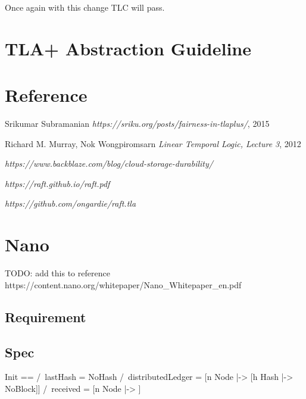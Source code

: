 \documentclass{report}
\begin{document}
Once again with this change TLC will pass.

\chapter{TLA+ Abstraction Guideline}

\chapter{Reference}

\begin{thebibliography}{9}

\bibitem{}
Srikumar Subramanian
\textit{https://sriku.org/posts/fairness-in-tlaplus/}, 2015

\bibitem{}
Richard M. Murray, Nok Wongpiromsarn
\textit{Linear Temporal Logic, Lecture 3}, 2012

\textit{https://www.backblaze.com/blog/cloud-storage-durability/}

\textit{https://raft.github.io/raft.pdf}

\textit{https://github.com/ongardie/raft.tla}

\end{thebibliography}

\chapter{Nano}

TODO: add this to reference\newline
https://content.nano.org/whitepaper/Nano\_Whitepaper\_en.pdf

\section{Requirement}

\section{Spec}

\begin{tla}
Init ==
    /\ lastHash = NoHash
    /\ distributedLedger = [n \in Node |-> [h \in Hash |-> NoBlock]]
    /\ received = [n \in Node |-> {}]
\end{tla}
\begin{tlatex}
%
%
%
\end{tlatex}
\end{document}
